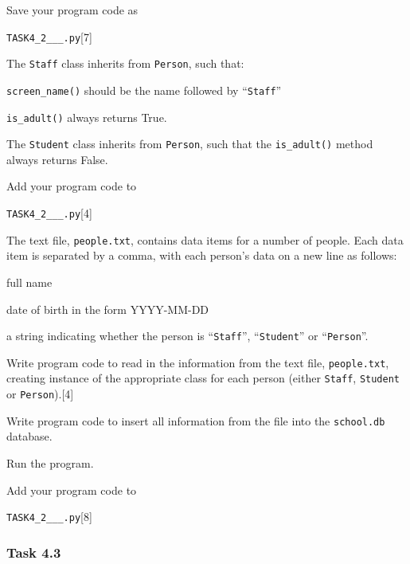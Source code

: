 \begin{onehalfspace}
\noindent Save your program code as

\noindent \texttt{TASK4\_2\_<your name>\_<centre number>\_<index number>.py}\hfill{}{[}7{]}

\noindent The \texttt{Staff} class inherits from \texttt{Person},
such that:
\end{onehalfspace}
\begin{itemize}
\begin{onehalfspace}
\item \texttt{screen\_name()} should be the name followed by ``\texttt{Staff}''
\item \texttt{is\_adult()} always returns True.
\end{onehalfspace}
\end{itemize}
\begin{onehalfspace}
\noindent The \texttt{Student} class inherits from \texttt{Person},
such that the \texttt{is\_adult()} method always returns False.

\noindent Add your program code to

\noindent \texttt{TASK4\_2\_<your name>\_<centre number>\_<index number>.py}\hfill{}{[}4{]}

\noindent The text file, \texttt{people.txt}, contains data items
for a number of people. Each data item is separated by a comma, with
each person's data on a new line as follows:
\end{onehalfspace}
\begin{itemize}
\begin{onehalfspace}
\item full name
\item date of birth in the form YYYY-MM-DD
\item a string indicating whether the person is ``\texttt{Staff}'', ``\texttt{Student}''
or ``\texttt{Person}''.
\end{onehalfspace}
\end{itemize}
\begin{onehalfspace}
\noindent Write program code to read in the information from the text
file, \texttt{people.txt}, creating instance of the appropriate class
for each person (either \texttt{Staff}, \texttt{Student} or \texttt{Person}).\hfill{}{[}4{]}

\noindent Write program code to insert all information from the file
into the \texttt{school.db} database.

\noindent Run the program.

\noindent Add your program code to

\noindent \texttt{TASK4\_2\_<your name>\_<centre number>\_<index number>.py}\hfill{}{[}8{]}
\end{onehalfspace}
\begin{onehalfspace}

\subsubsection*{Task 4.3}
\end{onehalfspace}

